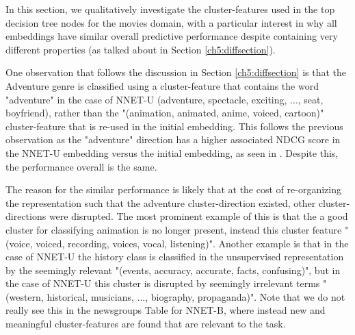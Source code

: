 In this section, we qualitatively investigate the cluster-features used in the top decision tree nodes for the movies domain, with a particular interest in why all embeddings have similar overall predictive performance despite containing very different properties (as talked about in Section \ref{ch5:diffsection}).

One observation that follows the discussion in Section \ref{ch5:diffsection} is that the Adventure genre is classified using a cluster-feature that contains the word "adventure" in the case of NNET-U (adventure, spectacle, exciting, ..., seat, boyfriend), rather than the "(animation, animated, anime, voiced, cartoon)" cluster-feature that is re-used in the initial embedding. This follows the previous observation as the "adventure" direction has a higher associated NDCG score in the NNET-U embedding versus the initial embedding, as seen in \label{ch5:diff}. Despite this, the performance overall is the same. 

The reason for the similar performance is likely that at the cost of re-organizing the representation such that the adventure cluster-direction existed, other cluster-directions were disrupted. The most prominent example of this is that the a good cluster for classifying animation is no longer present, instead this  cluster feature "(voice, voiced, recording, voices, vocal, listening)". Another example is that in the case of NNET-U the history class is classified in the unsupervised representation by the seemingly relevant "(events, accuracy, accurate, facts, confusing)", but in the case of NNET-U this cluster is disrupted by seemingly irrelevant terms "(western, historical, musicians, ..., biography, propaganda)". Note that we do not really see this in the newsgroups Table \label{ch5:dtng} for NNET-B, where instead new and meaningful cluster-features are found that are relevant to the task.

